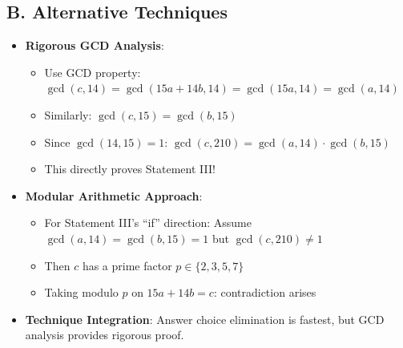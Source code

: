 \documentclass[12pt]{article}
\begin{document}
\begin{techniquesbox}
\subsection*{B. Alternative Techniques}
\begin{itemize}[leftmargin=*]
    \item \textbf{Rigorous GCD Analysis}: 
    \begin{itemize}
        \item Use GCD property: $\gcd(c, 14) = \gcd(15a+14b, 14) = \gcd(15a, 14) = \gcd(a, 14)$
        \item Similarly: $\gcd(c, 15) = \gcd(b, 15)$
        \item Since $\gcd(14,15)=1$: $\gcd(c, 210) = \gcd(a,14) \cdot \gcd(b,15)$
        \item This directly proves Statement III!
    \end{itemize}
    \item \textbf{Modular Arithmetic Approach}: 
    \begin{itemize}
        \item For Statement III's ``if'' direction: Assume $\gcd(a,14)=\gcd(b,15)=1$ but $\gcd(c,210) \neq 1$
        \item Then $c$ has a prime factor $p \in \{2,3,5,7\}$
        \item Taking modulo $p$ on $15a+14b=c$: contradiction arises
    \end{itemize}
    \item \textbf{Technique Integration}: Answer choice elimination is fastest, but GCD analysis provides rigorous proof.
\end{itemize}
\end{techniquesbox}
\end{document}
